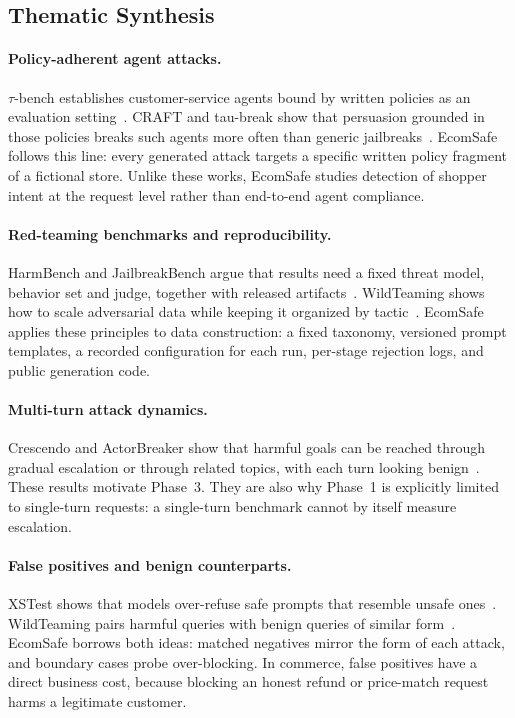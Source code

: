 \documentclass[sigconf,nonacm]{acmart}
\begin{document}
\subsection{Thematic Synthesis}
\label{sec:rw-synthesis}

\paragraph{Policy-adherent agent attacks.}
$\tau$-bench establishes customer-service agents bound by written policies as an evaluation setting~\cite{yao2025taubench}. CRAFT and tau-break show that persuasion grounded in those policies breaks such agents more often than generic jailbreaks~\cite{nakash2025effective}. EcomSafe follows this line: every generated attack targets a specific written policy fragment of a fictional store. Unlike these works, EcomSafe studies detection of shopper intent at the request level rather than end-to-end agent compliance.

\paragraph{Red-teaming benchmarks and reproducibility.}
HarmBench and JailbreakBench argue that results need a fixed threat model, behavior set and judge, together with released artifacts~\cite{mazeika2024harmbench,chao2024jailbreakbench}. WildTeaming shows how to scale adversarial data while keeping it organized by tactic~\cite{jiang2024wildteaming}. EcomSafe applies these principles to data construction: a fixed taxonomy, versioned prompt templates, a recorded configuration for each run, per-stage rejection logs, and public generation code.

\paragraph{Multi-turn attack dynamics.}
Crescendo and ActorBreaker show that harmful goals can be reached through gradual escalation or through related topics, with each turn looking benign~\cite{russinovich2025crescendo,ren2025llms}. These results motivate Phase~3. They are also why Phase~1 is explicitly limited to single-turn requests: a single-turn benchmark cannot by itself measure escalation.

\paragraph{False positives and benign counterparts.}
XSTest shows that models over-refuse safe prompts that resemble unsafe ones~\cite{rottger2024xstest}. WildTeaming pairs harmful queries with benign queries of similar form~\cite{jiang2024wildteaming}. EcomSafe borrows both ideas: matched negatives mirror the form of each attack, and boundary cases probe over-blocking. In commerce, false positives have a direct business cost, because blocking an honest refund or price-match request harms a legitimate customer.
\end{document}
